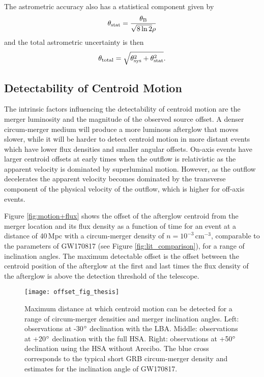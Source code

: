 The astrometric accuracy also has a statistical component given by
\begin{equation}
    \label{eq:astrometric_stat}
    \theta_{\rm stat} = \frac{\theta_{\rm B}}{\sqrt{8\ln 2}\rho}
\end{equation}
and the total astrometric uncertainty is then
\begin{equation}
    \theta_{\rm total} = \sqrt{\theta_{\rm sys}^2+\theta_{\rm stat}^2}.
\end{equation}


\subsection{Detectability of Centroid Motion}
\label{subsec:centroid_detectability}
The intrinsic factors influencing the detectability of centroid motion are the merger luminosity and the magnitude of the observed source offset. A denser circum-merger medium will produce a more luminous afterglow that moves slower, while it will be harder to detect centroid motion in more distant events which have lower flux densities and smaller angular offsets. On-axis events have larger centroid offsets at early times when the outflow is relativistic as the apparent velocity is dominated by superluminal motion. However, as the outflow decelerates the apparent velocity becomes dominated by the transverse component of the physical velocity of the outflow, which is higher for off-axis events.

Figure \ref{fig:motion+flux} shows the offset of the afterglow centroid from the merger location and its flux density as a function of time for an event at a distance of 40\,Mpc with a circum-merger density of $n=10^{-3}\,$cm$^{-3}$, comparable to the parameters of GW170817 (see Figure \ref{fig:lit_comparison}), for a range of inclination angles. The maximum detectable offset is the offset between the centroid position of the afterglow at the first and last times the flux density of the afterglow is above the detection threshold of the telescope.

\begin{figure*}
\texttt{[image: offset\_fig\_thesis]}
\caption[Detectability of centroid motion with VLBI]{Maximum distance at which centroid motion can be detected for a range of circum-merger densities and merger inclination angles. Left: observations at -30$\mbox{$^\circ$}$ declination with the LBA. Middle: observations at +20$\mbox{$^\circ$}$ declination with the full HSA. Right: observations at +50$\mbox{$^\circ$}$ declination using the HSA without Arecibo. The blue cross corresponds to the typical short GRB circum-merger density and estimates for the inclination angle of GW170817.}
\label{fig:offset_detectability_distance}
\end{figure*}

